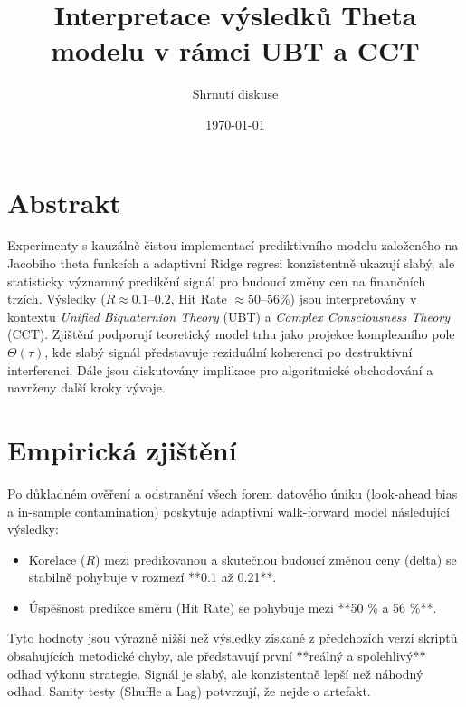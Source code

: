 \documentclass[12pt, a4paper]{article}
\title{Interpretace výsledků Theta modelu v rámci UBT a CCT}
\author{Shrnutí diskuse}
\date{\today}
\begin{document}
\maketitle

\section*{Abstrakt}
Experimenty s kauzálně čistou implementací prediktivního modelu založeného na Jacobiho theta funkcích a adaptivní Ridge regresi konzistentně ukazují slabý, ale statisticky významný predikční signál pro budoucí změny cen na finančních trzích. Výsledky ($R \approx 0.1$--$0.2$, Hit Rate $\approx 50$--$56\%$) jsou interpretovány v kontextu \emph{Unified Biquaternion Theory} (UBT) a \emph{Complex Consciousness Theory} (CCT). Zjištění podporují teoretický model trhu jako projekce komplexního pole $\Theta(\tau)$, kde slabý signál představuje reziduální koherenci po destruktivní interferenci. Dále jsou diskutovány implikace pro algoritmické obchodování a navrženy další kroky vývoje.

\section{Empirická zjištění}
Po důkladném ověření a odstranění všech forem datového úniku (look-ahead bias a in-sample contamination) poskytuje adaptivní walk-forward model následující výsledky:
\begin{itemize}
    \item Korelace ($R$) mezi predikovanou a skutečnou budoucí změnou ceny (delta) se stabilně pohybuje v rozmezí **0.1 až 0.21**.
    \item Úspěšnost predikce směru (Hit Rate) se pohybuje mezi **50 \% a 56 \%**.
\end{itemize}
Tyto hodnoty jsou výrazně nižší než výsledky získané z předchozích verzí skriptů obsahujících metodické chyby, ale představují první **reálný a spolehlivý** odhad výkonu strategie. Signál je slabý, ale konzistentně lepší než náhodný odhad. Sanity testy (Shuffle a Lag) potvrzují, že nejde o artefakt.
\end{document}
